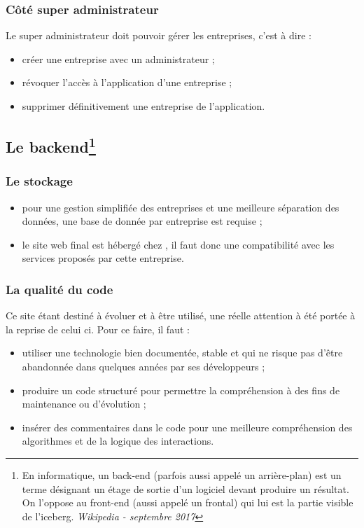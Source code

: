 \documentclass[a4paper, 11pt]{report}
\begin{document}
        \subsubsection{Côté super administrateur}
        Le super administrateur doit pouvoir gérer les entreprises, c'est à dire :
        \begin{itemize}
            \item créer une entreprise avec un administrateur ;
            \item révoquer l'accès à l'application d'une entreprise ;
            \item supprimer définitivement une entreprise de l'application.
        \end{itemize}
    \subsection[Le backend]{Le backend\footnote{En informatique, un back-end (parfois aussi appelé un arrière-plan) est un terme désignant un étage de sortie d'un logiciel devant produire un résultat. On l'oppose au front-end (aussi appelé un frontal) qui lui est la partie visible de l'iceberg. \textit{Wikipedia - septembre 2017}}}
        \subsubsection{Le stockage}
        \begin{itemize}
            \item pour une gestion simplifiée des entreprises et une meilleure séparation des données, une base de donnée par entreprise est requise ;
            \item  le site web final est hébergé chez \oswitch\cite{oswitch}, il faut donc une compatibilité avec les services proposés par cette entreprise.
        \end{itemize}

        \subsubsection{La qualité du code}
        Ce site étant destiné à évoluer et à être utilisé, une réelle attention à été portée à la reprise de celui ci. Pour ce faire, il faut :
        \begin{itemize}
            \item utiliser une technologie bien documentée, stable et qui ne risque pas d'être abandonnée dans quelques années par ses développeurs ;
            \item produire un code structuré pour permettre la compréhension à des fins de maintenance ou d'évolution ;
            \item insérer des commentaires dans le code pour une meilleure compréhension des algorithmes et de la logique des interactions.
        \end{itemize}
\end{document}
